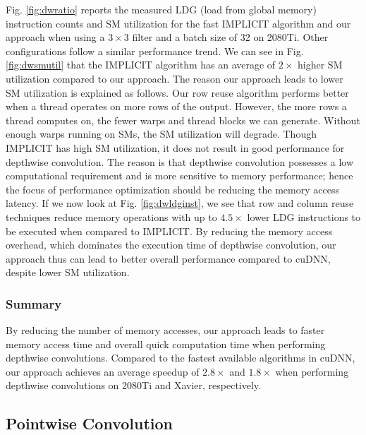 Fig. \ref{fig:dwratio} reports the measured LDG (load from global memory) instruction counts and SM utilization for the fast IMPLICIT algorithm and our approach when using a $3 \times 3$ filter and a batch size of 32 on 2080Ti. Other configurations follow a similar
performance trend. We can see in Fig. \ref{fig:dwsmutil} that the IMPLICIT algorithm has an average of $2\times$ higher SM
utilization compared to our approach. The reason our approach leads to lower SM utilization is explained as follows. Our row reuse
algorithm performs better when a thread operates on more rows of the output. However, the more rows a thread computes on, the fewer warps
and thread blocks we can generate. Without enough warps running on SMs, the SM utilization will degrade. Though IMPLICIT has high SM
utilization, it does not result in good performance for depthwise convolution. The reason is that depthwise convolution possesses a low
computational requirement and is more sensitive to memory performance; hence the focus of performance optimization should be reducing the
memory access latency.  If we now look at Fig. \ref{fig:dwldginst}, we see that row and column reuse techniques reduce memory operations
with up to $4.5\times$ lower LDG instructions to be executed when compared to  IMPLICIT. By reducing the memory access overhead, which
dominates the execution time of depthwise convolution, our approach thus can lead to better overall performance compared to cuDNN, despite
lower SM utilization.


\subsubsection{Summary}
By reducing the number of memory accesses, our approach leads to faster memory access time and overall quick computation time when
performing depthwise convolutions. Compared to the fastest available algorithms in cuDNN, our approach achieves an average speedup of
$2.8\times$ and $1.8\times$ when performing depthwise convolutions on 2080Ti and Xavier, respectively.


\subsection{Pointwise Convolution}
\label{sec:pwconvexp}

